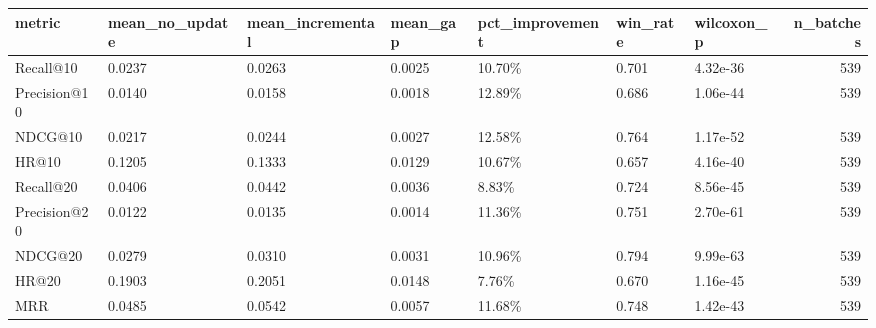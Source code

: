 \begin{tabular}{lllllllr}
\toprule
metric & mean_no_update & mean_incremental & mean_gap & pct_improvement & win_rate & wilcoxon_p & n_batches \\
\midrule
Recall@10 & 0.0237 & 0.0263 & 0.0025 & 10.70\% & 0.701 & 4.32e-36 & 539 \\
Precision@10 & 0.0140 & 0.0158 & 0.0018 & 12.89\% & 0.686 & 1.06e-44 & 539 \\
NDCG@10 & 0.0217 & 0.0244 & 0.0027 & 12.58\% & 0.764 & 1.17e-52 & 539 \\
HR@10 & 0.1205 & 0.1333 & 0.0129 & 10.67\% & 0.657 & 4.16e-40 & 539 \\
Recall@20 & 0.0406 & 0.0442 & 0.0036 & 8.83\% & 0.724 & 8.56e-45 & 539 \\
Precision@20 & 0.0122 & 0.0135 & 0.0014 & 11.36\% & 0.751 & 2.70e-61 & 539 \\
NDCG@20 & 0.0279 & 0.0310 & 0.0031 & 10.96\% & 0.794 & 9.99e-63 & 539 \\
HR@20 & 0.1903 & 0.2051 & 0.0148 & 7.76\% & 0.670 & 1.16e-45 & 539 \\
MRR & 0.0485 & 0.0542 & 0.0057 & 11.68\% & 0.748 & 1.42e-43 & 539 \\
\bottomrule
\end{tabular}
